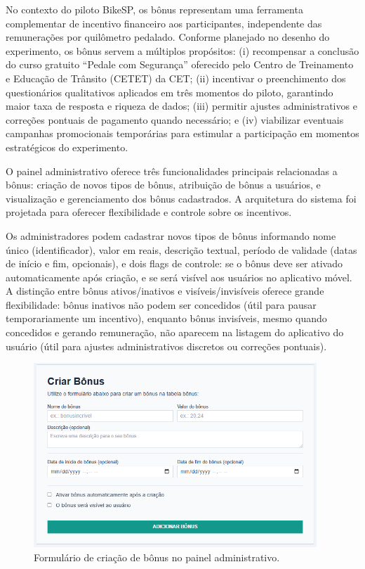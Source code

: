 

No contexto do piloto BikeSP, os bônus
representam uma ferramenta complementar de incentivo financeiro aos participantes,
independente das remunerações por quilômetro pedalado. Conforme planejado no desenho
do experimento, os bônus servem a múltiplos propósitos: (i) recompensar a conclusão
do curso gratuito ``Pedale com Segurança'' oferecido pelo Centro de Treinamento e
Educação de Trânsito (CETET) da CET; (ii) incentivar o preenchimento dos
questionários qualitativos aplicados em três momentos do piloto, garantindo maior
taxa de resposta e riqueza de dados; (iii) permitir ajustes administrativos e
correções pontuais de pagamento quando necessário; e (iv) viabilizar eventuais
campanhas promocionais temporárias para estimular a participação em momentos
estratégicos do experimento.

O painel administrativo oferece três
funcionalidades principais relacionadas a bônus: criação de novos tipos de bônus,
atribuição de bônus a usuários, e visualização e gerenciamento dos bônus
cadastrados. A arquitetura do sistema foi projetada para oferecer flexibilidade e controle sobre os incentivos.

Os administradores podem cadastrar novos tipos de bônus
informando nome único (identificador), valor em reais, descrição textual, período
de validade (datas de início e fim, opcionais), e dois flags de controle: se o
bônus deve ser ativado automaticamente após criação, e se será visível aos
usuários no aplicativo móvel. A distinção entre bônus ativos/inativos e
visíveis/invisíveis oferece grande flexibilidade: bônus inativos não podem ser
concedidos (útil para pausar temporariamente um incentivo), enquanto bônus
invisíveis, mesmo quando concedidos e gerando remuneração, não aparecem na
listagem do aplicativo do usuário (útil para ajustes administrativos discretos ou
correções pontuais).

 \begin{figure}[H]
   \centering
   \includegraphics[width=0.95\textwidth]{figuras/criar_bonus.PNG}
   \caption{Formulário de criação de bônus no painel administrativo.}
   \label{fig:bonus_criar_form}
 \end{figure}

